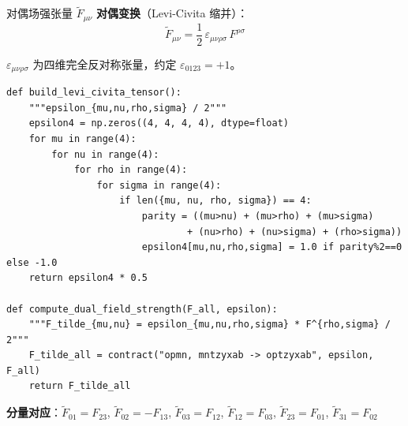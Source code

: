 \documentclass[10pt,aspectratio=169]{beamer}
\begin{document}
\begin{frame}[fragile]{对偶场强张量 $\tilde{F}_{\mu\nu}$}
\small
\textbf{对偶变换}（Levi-Civita 缩并）：
\begin{equation}
  \boxed{
  \tilde{F}_{\mu\nu} = \frac{1}{2}\,\varepsilon_{\mu\nu\rho\sigma}\,F^{\rho\sigma}
  }
\end{equation}

$\varepsilon_{\mu\nu\rho\sigma}$ 为四维完全反对称张量，约定 $\varepsilon_{0123} = +1$。

\begin{lstlisting}
def build_levi_civita_tensor():
    """epsilon_{mu,nu,rho,sigma} / 2"""
    epsilon4 = np.zeros((4, 4, 4, 4), dtype=float)
    for mu in range(4):
        for nu in range(4):
            for rho in range(4):
                for sigma in range(4):
                    if len({mu, nu, rho, sigma}) == 4:
                        parity = ((mu>nu) + (mu>rho) + (mu>sigma)
                                + (nu>rho) + (nu>sigma) + (rho>sigma))
                        epsilon4[mu,nu,rho,sigma] = 1.0 if parity%2==0 else -1.0
    return epsilon4 * 0.5

def compute_dual_field_strength(F_all, epsilon):
    """F_tilde_{mu,nu} = epsilon_{mu,nu,rho,sigma} * F^{rho,sigma} / 2"""
    F_tilde_all = contract("opmn, mntzyxab -> optzyxab", epsilon, F_all)
    return F_tilde_all
\end{lstlisting}

\textbf{分量对应}：$\tilde{F}_{01} = F_{23}$, $\tilde{F}_{02} = -F_{13}$, $\tilde{F}_{03} = F_{12}$, $\tilde{F}_{12} = F_{03}$, $\tilde{F}_{23} = F_{01}$, $\tilde{F}_{31} = F_{02}$
\end{frame}
\end{document}
